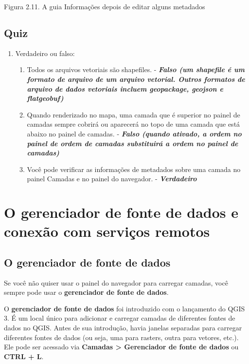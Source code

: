 \documentclass[
]{krantz}
\providecommand{\tightlist}{%
  \setlength{\itemsep}{0pt}\setlength{\parskip}{0pt}}
\begin{document}
Figura 2.11. A guia Informações depois de editar alguns metadados

\hypertarget{quiz-6}{%
\subsection{Quiz}\label{quiz-6}}

\begin{enumerate}
\def\labelenumi{\arabic{enumi}.}
\item
  Verdadeiro ou falso:

  \begin{enumerate}
  \def\labelenumii{\arabic{enumii}.}
  \tightlist
  \item
    Todos os arquivos vetoriais são shapefiles. - \textbf{\emph{Falso (um shapefile é um formato de arquivo de um arquivo vetorial. Outros formatos de arquivo de dados vetoriais incluem geopackage, geojson e flatgeobuf)}}
  \item
    Quando renderizado no mapa, uma camada que é superior no painel de camadas sempre cobrirá ou aparecerá no topo de uma camada que está abaixo no painel de camadas. - \textbf{\emph{Falso (quando ativado, a ordem no painel de ordem de camadas substituirá a ordem no painel de camadas)}}
  \item
    Você pode verificar as informações de metadados sobre uma camada no painel Camadas e no painel do navegador. - \textbf{\emph{Verdadeiro}}
  \end{enumerate}
\end{enumerate}

\hypertarget{o-gerenciador-de-fonte-de-dados-e-conexuxe3o-com-serviuxe7os-remotos}{%
\section{O gerenciador de fonte de dados e conexão com serviços remotos}\label{o-gerenciador-de-fonte-de-dados-e-conexuxe3o-com-serviuxe7os-remotos}}

\hypertarget{o-gerenciador-de-fonte-de-dados}{%
\subsection{O gerenciador de fonte de dados}\label{o-gerenciador-de-fonte-de-dados}}

Se você não quiser usar o painel do navegador para carregar camadas, você sempre pode usar o \textbf{gerenciador de fonte de dados}.

O \textbf{gerenciador de fonte de dados} foi introduzido com o lançamento do QGIS 3. É um local único para adicionar e carregar camadas de diferentes fontes de dados no QGIS. Antes de sua introdução, havia janelas separadas para carregar diferentes fontes de dados (ou seja, uma para rasters, outra para vetores, etc.). Ele pode ser acessado via \textbf{Camadas \textgreater{} Gerenciador de fonte de dados} ou \textbf{CTRL + L}.
\end{document}
